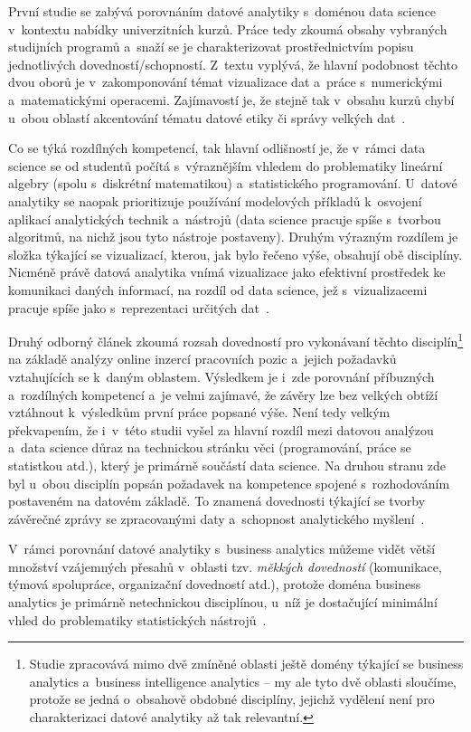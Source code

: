 První studie se zabývá porovnáním datové analytiky s~doménou data science v~kontextu nabídky univerzitních kurzů. Práce tedy zkoumá obsahy vybraných studijních programů a~snaží se je charakterizovat prostřednictvím popisu jednotlivých dovedností/schopností. Z~textu vyplývá, že hlavní podobnost těchto dvou oborů je v~zakomponování témat vizualizace dat a~práce s~numerickými a~matematickými operacemi. Zajímavostí je, že stejně tak v~obsahu kurzů chybí u~obou oblastí akcentování tématu datové etiky či správy velkých dat~\parencite[109]{aasheim2015}.

Co se týká rozdílných kompetencí, tak hlavní odlišností je, že v~rámci data science se od studentů počítá s~výraznějším vhledem do problematiky lineární algebry (spolu s~diskrétní matematikou) a~statistického programování. U~datové analytiky se naopak prioritizuje používání modelových příkladů k~osvojení aplikací analytických technik a~nástrojů (data science pracuje spíše s~tvorbou algoritmů, na nichž jsou tyto nástroje postaveny). Druhým výrazným rozdílem je složka týkající se vizualizací, kterou, jak bylo řečeno výše, obsahují obě disciplíny. Nicméně právě datová analytika vnímá vizualizace jako efektivní prostředek ke komunikaci daných informací, na rozdíl od data science, jež s~vizualizacemi pracuje spíše jako s~reprezentaci určitých dat~\parencite[110]{aasheim2015}.

Druhý odborný článek zkoumá rozsah dovedností pro vykonávaní těchto disciplín\footnote{Studie zpracovává mimo dvě zmíněné oblasti ještě domény týkající se business analytics a~business intelligence analytics – my ale tyto dvě oblasti sloučíme, protože se jedná o~obsahově obdobné disciplíny, jejichž vydělení není pro charakterizaci datové analytiky až tak relevantní.} na základě analýzy online inzercí pracovních pozic a~jejich požadavků vztahujících se k~daným oblastem. Výsledkem je i~zde porovnání příbuzných a~rozdílných kompetencí a~je velmi zajímavé, že závěry lze bez velkých obtíží vztáhnout k~výsledkům první práce popsané výše. Není tedy velkým překvapením, že i~v~této studii vyšel za hlavní rozdíl mezi datovou analýzou a~data science důraz na technickou stránku věci (programování, práce se statistkou atd.), který je primárně součástí data science. Na druhou stranu zde byl u~obou disciplín popsán požadavek na kompetence spojené s~rozhodováním postaveném na datovém základě. To znamená dovednosti týkající se tvorby závěrečné zprávy se zpracovanými daty a~schopnost analytického myšlení~\parencite[248]{verma19}.

V~rámci porovnání datové analytiky s~business analytics můžeme vidět větší množství vzájemných přesahů v~oblasti tzv. \emph{měkkých dovedností} (komunikace, týmová spolupráce, organizační dovedností atd.), protože doména business analytics je primárně netechnickou disciplínou, u~níž je dostačující minimální vhled do problematiky statistických nástrojů~\parencite[249]{verma19}.

